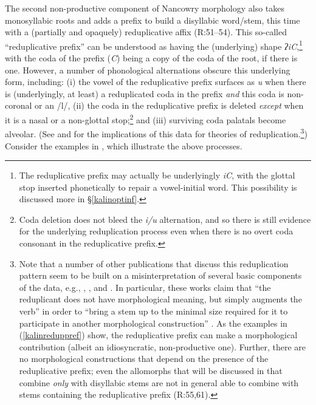 \documentclass[output=paper]{langscibook}
\begin{document}
The second non-productive component of Nancowry morphology also takes monosyllabic roots and adds a prefix to build a disyllabic word/stem, this time with a (partially and opaquely) reduplicative affix (R:51--54). This so-called ``reduplicative prefix'' can be understood as having the (underlying) shape \textit{ʔiC},\footnote{The reduplicative prefix may actually be underlyingly \textit{iC}, with the glottal stop inserted phonetically to repair a vowel-initial word. This possibility is discussed more in \S\ref{kalinoptinf}.} with the coda of the prefix (\textit{C}) being a copy of the coda of the root, if there is one. However, a number of phonological alternations obscure this underlying form, including: (i)  the vowel of the reduplicative prefix surfaces as \textit{u} when there is (underlyingly, at least) a reduplicated coda in the prefix {\it and} this coda is non-coronal or an /l/, (ii) the coda in the reduplicative prefix is deleted {\it except} when it is a nasal or a non-glottal stop;\footnote{Coda deletion does {not} bleed the \textit{i/u} alternation, and so there is still evidence for the underlying reduplication process even when there is no overt coda consonant in the reduplicative prefix.} and (iii) surviving coda palatals become alveolar. (See \citealt[132ff.]{Steriade88} and \citealt[347ff.]{Alderete99} for the implications of this data for theories of reduplication.\footnote{Note that a number of other publications that discuss this reduplication pattern seem to be built on a misinterpretation of several basic components of the data, e.g., \citealt[247ff]{Hendricks99}, \citealt{Meek00}, and \citealt[223--224]{IZ05}. In particular, these works claim that ``the reduplicant does not have morphological meaning, but simply augments the verb'' \citep[58]{Hendricks99} in order to ``bring a stem up to the minimal size required for it to participate in another morphological construction'' \citep[200--201]{IZ05}. As the examples in (\ref{kalinreduppref}) show, the reduplicative prefix can make a morphological contribution (albeit an idiosyncratic, non-productive one). Further, there are no morphological constructions that depend on the presence of the reduplicative prefix; even the allomorphs that will be discussed in  that combine {\it only} with disyllabic stems are not in general able to combine with stems containing the reduplicative prefix (R:55,61).}) Consider the examples in \Next, which illustrate the above processes.

\ea\label{kalinreduppref} 
\z
\z
\end{document}
